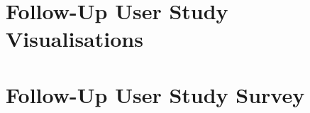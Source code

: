 \chapter{Follow-Up User Study Visualisations}
\label{appendix:follow-up-user-study-visualisations}


\chapter{Follow-Up User Study Survey}
\label{appendix:follow-up-user-study-survey}

\clearpage

\begin{center}
\end{center}

